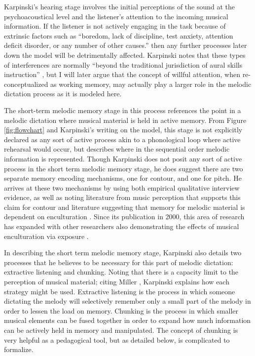 \documentclass[]{book}
\begin{document}
Karpinski's hearing stage involves the initial perceptions of the sound at the psychoacoustical level and the listener's attention to the incoming musical information.
If the listener is not actively engaging in the task because of extrinsic factors such as ``boredom, lack of discipline, test anxiety, attention deficit disorder, or any number of other causes.'' \citep[p.65]{karpinskiAuralSkillsAcquisition2000} then any further processes later down the model will be detrimentally affected.
Karpinski notes that these types of interferences are normally ``beyond the traditional jurisdiction of aural skills instruction'' \citep[p.65]{karpinskiAuralSkillsAcquisition2000}, but I will later argue that the concept of willful attention, when re-conceptualized as working memory, may actually play a larger role in the melodic dictation process as it is modeled here.

The short-term melodic memory stage in this process references the point in a melodic dictation where musical material is held in active memory.
From Figure \ref{fig:flowchart} and Karpinski's writing on the model, this stage is not explicitly declared as any sort of active process akin to a phonological loop \citep{baddeleyEpisodicBufferNew2000} where active rehearsal would occur, but describes where in the sequential order melodic information is represented.
Though Karpinski does not posit any sort of active process in the short term melodic memory stage, he does suggest there are two separate memory encoding mechanisms, one for contour, and one for pitch.
He arrives at these two mechanisms by using both empirical qualitative interview evidence, as well as noting literature from music perception that supports this claim for contour \citep{dowlingScaleContourTwo1978, dewittRecognitionNovelMelodies1986} and literature suggesting that memory for melodic material is dependent on enculturation \citep{ouraMemoryMelodiesSubjects1988, handelListeningIntroductionPerception1989, dowlingExpectancyAttentionMelody1990}.
Since its publication in 2000, this area of research has expanded with other researchers also demonstrating the effects of musical enculturation via exposure \citep{eerolaExpectancySamiYoiks2009, stevensMusicPerceptionCognition2012, pearceAuditoryExpectationInformation2012, pearceStatisticalLearningProbabilistic2018a}.

In describing the short term melodic memory stage, Karpinski also details two processes that he believes to be necessary for this part of melodic dictation: extractive listening and chunking.
Noting that there is a capacity limit to the perception of musical material; citing Miller \citeyearpar{millerMagicalNumberSeven1956}, Karpinski explains how each strategy might be used.
Extractive listening is the process in which someone dictating the melody will selectively remember only a small part of the melody in order to lessen the load on memory.
Chunking is the process in which smaller musical elements can be fused together in order to expand how much information can be actively held in memory and manipulated.
The concept of chunking is very helpful as a pedagogical tool, but as detailed below, is complicated to formalize.
\end{document}
